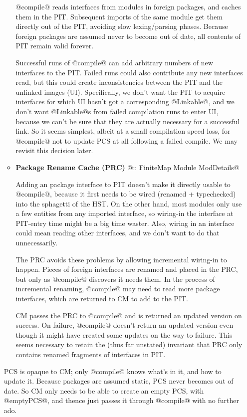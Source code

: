 \documentclass[11pt]{article}
\begin{document}
\begin{itemize}
\begin{itemize}
   @compile@ reads interfaces from modules in foreign packages, and
   caches them in the PIT.  Subsequent imports of the same module get
   them directly out of the PIT, avoiding slow lexing/parsing phases.
   Because foreign packages are assumed never to become out of date,
   all contents of PIT remain valid forever.

   Successful runs of @compile@ can add arbitrary numbers of new
   interfaces to the PIT.  Failed runs could also contribute any new
   interfaces read, but this could create inconsistencies between the
   PIT and the unlinked images (UI).  Specifically, we don't want the
   PIT to acquire interfaces for which UI hasn't got a corresponding
   @Linkable@, and we don't want @Linkable@s from failed compilation
   runs to enter UI, because we can't be sure that they are actually
   necessary for a successful link.  So it seems simplest, albeit at a
   small compilation speed loss, for @compile@ not to update PCS at
   all following a failed compile.  We may revisit this
   decision later.

   \item
      {\bf Package Rename Cache (PRC)} @:: FiniteMap Module ModDetails@

   Adding an package interface to PIT doesn't make it directly usable
   to @compile@, because it first needs to be wired (renamed +
   typechecked) into the sphagetti of the HST.  On the other hand,
   most modules only use a few entities from any imported interface,
   so wiring-in the interface at PIT-entry time might be a big time
   waster.  Also, wiring in an interface could mean reading other
   interfaces, and we don't want to do that unnecessarily.

   The PRC avoids these problems by allowing incremental wiring-in to
   happen.  Pieces of foreign interfaces are renamed and placed in the
   PRC, but only as @compile@ discovers it needs them.  In the process
   of incremental renaming, @compile@ may need to read more package
   interfaces, which are returned to CM to add to the PIT.

   CM passes the PRC to @compile@ and is returned an updated version
   on success.  On failure, @compile@ doesn't return an updated
   version even though it might have created some updates on the way
   to failure.  This seems necessary to retain the (thus far unstated)
   invariant that PRC only contains renamed fragments of interfaces in
   PIT.
   \end{itemize}

   PCS is opaque to CM; only @compile@ knows what's in it, and how to
   update it.  Because packages are assumed static, PCS never becomes
   out of date.  So CM only needs to be able to create an empty PCS,
   with @emptyPCS@, and thence just passes it through @compile@ with
   no further ado.


\end{itemize}
\end{document}
